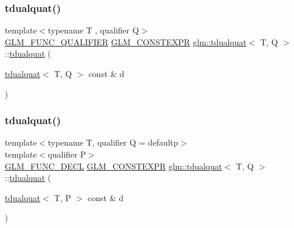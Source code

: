 \mbox{\label{structglm_1_1tdualquat_ad6099c663113c443a9efeeabbd321bd1}} 
\subsubsection{\texorpdfstring{tdualquat()}{tdualquat()}\hspace{0.1cm}{\footnotesize\ttfamily [2/11]}}
{\footnotesize\ttfamily template$<$typename T , qualifier Q$>$ \\
\mbox{\hyperlink{setup_8hpp_a33fdea6f91c5f834105f7415e2a64407}{G\+L\+M\+\_\+\+F\+U\+N\+C\+\_\+\+Q\+U\+A\+L\+I\+F\+I\+ER}} \mbox{\hyperlink{setup_8hpp_a08b807947b47031d3a511f03f89645ad}{G\+L\+M\+\_\+\+C\+O\+N\+S\+T\+E\+X\+PR}} \mbox{\hyperlink{structglm_1_1tdualquat}{glm\+::tdualquat}}$<$ T, Q $>$\+::\mbox{\hyperlink{structglm_1_1tdualquat}{tdualquat}} (\begin{DoxyParamCaption}\item[{\mbox{\hyperlink{structglm_1_1tdualquat}{tdualquat}}$<$ T, Q $>$ const \&}]{d }\end{DoxyParamCaption})}

\mbox{\label{structglm_1_1tdualquat_a23b9100d907a648204929a4c3392a56a}} 
\subsubsection{\texorpdfstring{tdualquat()}{tdualquat()}\hspace{0.1cm}{\footnotesize\ttfamily [3/11]}}
{\footnotesize\ttfamily template$<$typename T, qualifier Q = defaultp$>$ \\
template$<$qualifier P$>$ \\
\mbox{\hyperlink{setup_8hpp_ab2d052de21a70539923e9bcbf6e83a51}{G\+L\+M\+\_\+\+F\+U\+N\+C\+\_\+\+D\+E\+CL}} \mbox{\hyperlink{setup_8hpp_a08b807947b47031d3a511f03f89645ad}{G\+L\+M\+\_\+\+C\+O\+N\+S\+T\+E\+X\+PR}} \mbox{\hyperlink{structglm_1_1tdualquat}{glm\+::tdualquat}}$<$ T, Q $>$\+::\mbox{\hyperlink{structglm_1_1tdualquat}{tdualquat}} (\begin{DoxyParamCaption}\item[{\mbox{\hyperlink{structglm_1_1tdualquat}{tdualquat}}$<$ T, P $>$ const \&}]{d }\end{DoxyParamCaption})}

